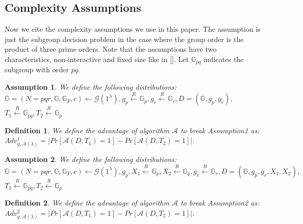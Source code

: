 \documentclass[smallextended]{svjour3}       %
\begin{document}
\subsection{Complexity Assumptions} \label{Complexity_Assumptions}
	Now we cite the complexity assumptions we use in this paper. 
	The assumption is just the subgroup decision problem in the case where the group order is the product of three prime orders.
	Note that the assumptions have two characteristics, non-interactive and fixed size like in \ref{}.  
	Let $\mathbb{G}_{pq}$ indicates the subgroup with order $pq$.
\newtheorem{myAssumption}{Assumption} 
\newtheorem{myDefinition}{Definition}
\begin{myAssumption}\label{myAssumption1}
	We define the following distributions: \\
	$\mathbb{G}=(N=pqr,\mathbb{G},\mathbb{G}_T,e)\leftarrow\mathcal{G}(1^{\lambda}),g_p\stackrel{R}{\longleftarrow}\mathbb{G}_p,g_r\stackrel{R}{\longleftarrow}\mathbb{G}_r,D=(\mathbb{G},g_p,g_r),$\\
	$T_1\stackrel{R}{\longleftarrow}\mathbb{G}_{pq},T_2\stackrel{R}{\longleftarrow}\mathbb{G}_p$
\end{myAssumption} 
\begin{myDefinition}
	\item We define the advantage of algorithm $\mathcal{A}$ to break Assumption1 as: $Adv_{g,\mathcal{A}(\lambda)}^{1}=|Pr[\mathcal{A}(D,T_1)=1]-Pr[\mathcal{A}(D,T_2)=1]|$.
\end{myDefinition}

\begin{myAssumption}\label{myAssumption2}
	We define the following distributions:\\
	$\mathbb{G}=(N=pqr,\mathbb{G},\mathbb{G}_T,e)\leftarrow\mathcal{G}(1^{\lambda}),g_p, X_1\stackrel{R}{\longleftarrow}\mathbb{G}_p, X_2\stackrel{R}{\longleftarrow}\mathbb{G}_q,g_r\stackrel{R}{\longleftarrow}\mathbb{G}_r,D=(\mathbb{G},g_p,g_r,X_1,X_2),$\\
	$T_1\stackrel{R}{\longleftarrow}\mathbb{G}_{pq},T_2\stackrel{R}{\longleftarrow}\mathbb{G}_p$
\end{myAssumption} 
\begin{myDefinition}
	\item We define the advantage of algorithm $\mathcal{A}$ to break Assumption2 as: $Adv_{g,\mathcal{A}(\lambda)}^{2}=|Pr[\mathcal{A}(D,T_1)=1]-Pr[\mathcal{A}(D,T_2)=1]|$.
\end{myDefinition}
\end{document}
